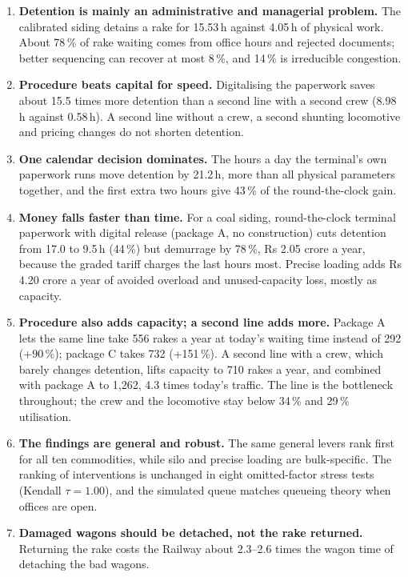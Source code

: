 \begin{enumerate}
    \item \textbf{Detention is mainly an administrative and managerial problem.} The calibrated siding detains a rake for 15.53\,h against 4.05\,h of physical work. About 78\,\% of rake waiting comes from office hours and rejected documents; better sequencing can recover at most 8\,\%, and 14\,\% is irreducible congestion.
    \item \textbf{Procedure beats capital for speed.} Digitalising the paperwork saves about 15.5 times more detention than a second line with a second crew (8.98\,h against 0.58\,h). A second line without a crew, a second shunting locomotive and pricing changes do not shorten detention.
    \item \textbf{One calendar decision dominates.} The hours a day the terminal's own paperwork runs move detention by 21.2\,h, more than all physical parameters together, and the first extra two hours give 43\,\% of the round-the-clock gain.
    \item \textbf{Money falls faster than time.} For a coal siding, round-the-clock terminal paperwork with digital release (package A, no construction) cuts detention from 17.0 to 9.5\,h (44\,\%) but demurrage by 78\,\%, Rs 2.05 crore a year, because the graded tariff charges the last hours most. Precise loading adds Rs 4.20 crore a year of avoided overload and unused-capacity loss, mostly as capacity.
    \item \textbf{Procedure also adds capacity; a second line adds more.} Package A lets the same line take 556 rakes a year at today's waiting time instead of 292 (+90\,\%); package C takes 732 (+151\,\%). A second line with a crew, which barely changes detention, lifts capacity to 710 rakes a year, and combined with package A to 1,262, 4.3 times today's traffic. The line is the bottleneck throughout; the crew and the locomotive stay below 34\,\% and 29\,\% utilisation.
    \item \textbf{The findings are general and robust.} The same general levers rank first for all ten commodities, while silo and precise loading are bulk-specific. The ranking of interventions is unchanged in eight omitted-factor stress tests (Kendall $\tau = 1.00$), and the simulated queue matches queueing theory when offices are open.
    \item \textbf{Damaged wagons should be detached, not the rake returned.} Returning the rake costs the Railway about 2.3--2.6 times the wagon time of detaching the bad wagons.
\end{enumerate}

